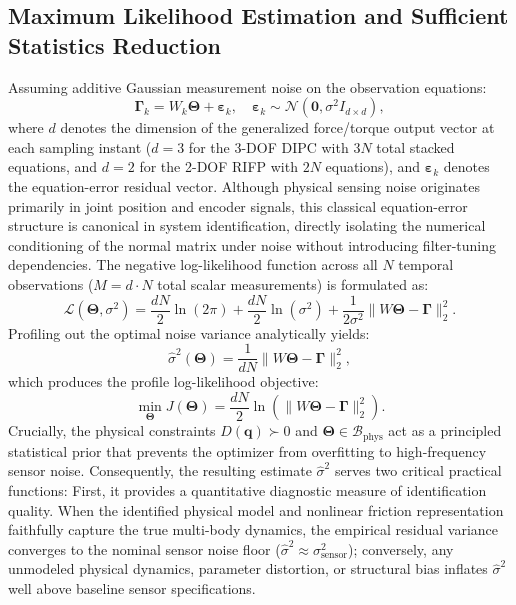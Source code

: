 \documentclass[lettersize,journal]{IEEEtran}
\begin{document}
\subsection{Maximum Likelihood Estimation and Sufficient Statistics Reduction}
Assuming additive Gaussian measurement noise on the observation equations:
\begin{equation}
    \bm{\Gamma}_k = W_k \bm{\Theta} + \bm{\varepsilon}_k, \quad \bm{\varepsilon}_k \sim \mathcal{N}(\mathbf{0}, \sigma^2 I_{d \times d}),
\end{equation}
where $d$ denotes the dimension of the generalized force/torque output vector at each sampling instant ($d = 3$ for the 3-DOF DIPC with $3N$ total stacked equations, and $d = 2$ for the 2-DOF RIFP with $2N$ equations), and $\bm{\varepsilon}_k$ denotes the equation-error residual vector. Although physical sensing noise originates primarily in joint position and encoder signals, this classical equation-error structure is canonical in system identification, directly isolating the numerical conditioning of the normal matrix under noise without introducing filter-tuning dependencies. The negative log-likelihood function across all $N$ temporal observations ($M = d \cdot N$ total scalar measurements) is formulated as:
\begin{equation}
    \mathcal{L}(\bm{\Theta}, \sigma^2) = \frac{d N}{2} \ln(2\pi) + \frac{d N}{2} \ln(\sigma^2) + \frac{1}{2\sigma^2} \| W\bm{\Theta} - \bm{\Gamma} \|_2^2.
\end{equation}
Profiling out the optimal noise variance analytically yields:
\begin{equation}
    \hat{\sigma}^2(\bm{\Theta}) = \frac{1}{d N} \| W\bm{\Theta} - \bm{\Gamma} \|_2^2,
    \label{eq:sigma_profile}
\end{equation}
which produces the profile log-likelihood objective:
\begin{equation}
    \min_{\bm{\Theta}} J(\bm{\Theta}) = \frac{d N}{2} \ln \left( \| W\bm{\Theta} - \bm{\Gamma} \|_2^2 \right).
    \label{eq:mle_obj}
\end{equation}
Crucially, the physical constraints $D(\bm{q}) \succ 0$ and $\bm{\Theta} \in \mathcal{B}_{\mathrm{phys}}$ act as a principled statistical prior that prevents the optimizer from overfitting to high-frequency sensor noise. Consequently, the resulting estimate $\hat{\sigma}^2$ serves two critical practical functions:
First, it provides a quantitative diagnostic measure of identification quality. When the identified physical model and nonlinear friction representation faithfully capture the true multi-body dynamics, the empirical residual variance converges to the nominal sensor noise floor ($\hat{\sigma}^2 \approx \sigma_{\text{sensor}}^2$); conversely, any unmodeled physical dynamics, parameter distortion, or structural bias inflates $\hat{\sigma}^2$ well above baseline sensor specifications.
\end{document}
